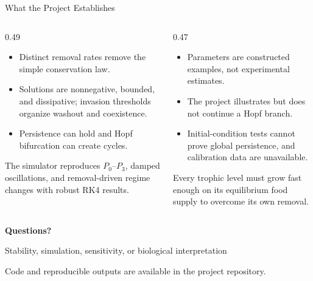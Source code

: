 
\begin{frame}{What the Project Establishes}
  \begin{columns}[T,onlytextwidth]
    \begin{column}{0.49\textwidth}
      \begin{itemize}
        \item Distinct removal rates remove the simple conservation law.
        \item Solutions are nonnegative, bounded, and dissipative; invasion
              thresholds organize washout and coexistence.
        \item Persistence can hold and Hopf bifurcation can create cycles.
      \end{itemize}

      \vspace{0.18cm}
      \par The simulator reproduces $P_0$--$P_3$, damped oscillations, and
      removal-driven regime changes with robust RK4 results.
    \end{column}
    \begin{column}{0.47\textwidth}
      \begin{itemize}
        \item Parameters are constructed examples, not experimental estimates.
        \item The project illustrates but does not continue a Hopf branch.
        \item Initial-condition tests cannot prove global persistence, and
              calibration data are unavailable.
      \end{itemize}

      \vspace{0.28cm}
      \par
      Every trophic level must grow fast enough on its equilibrium food supply
      to overcome its own removal.
    \end{column}
  \end{columns}
\end{frame}

\begin{frame}[plain]
  \centering
  \vspace{1.25cm}
  {\color{HUSTNavy}\fontsize{40}{46}\selectfont\bfseries Questions?\par}
  \vspace{0.45cm}
  {\color{HUSTTeal}\fontsize{20}{25}\selectfont
    Stability, simulation, sensitivity, or biological interpretation\par}
  \vspace{0.9cm}
  {\fontsize{14}{18}\selectfont\color{MidGray}
    Code and reproducible outputs are available in the project repository.}
\end{frame}
